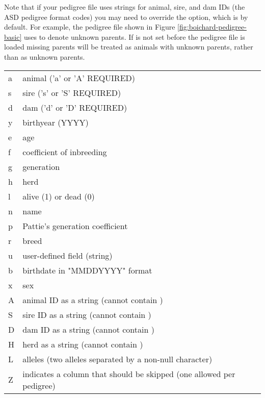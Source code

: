 Note that if your pedigree file uses strings for animal, sire, and dam IDs (the ASD pedigree format codes) you may need to override the  option, which is  by default.  For example, the pedigree file shown in Figure \ref{fig:boichard-pedigree-basic} uses  to denote unknown parents.  If  is not set before the pedigree file is loaded missing parents will be treated as animals with unknown parents, rather than as unknown parents.
\begin{center}
    \tablelasttail{\hline}
    \label{tbl:pedigree-format-codes}
    \begin{xtabular}{l|p{4in}}
	a & animal ('a' or 'A' REQUIRED)\\
	s & sire ('s' or 'S' REQUIRED)\\
	d & dam ('d' or 'D' REQUIRED)\\
	y & birthyear (YYYY)\\
	e & age\\
	f & coefficient of inbreeding\\
	g & generation\\
	h & herd\\
	l & alive (1) or dead (0)\\
	n & name\\
	p & Pattie's \citeyear{Pattie1965} generation coefficient\\
	r & breed\\
	u & user-defined field (string)\\
	b & birthdate in "MMDDYYYY" format\\
	x & sex\\
	A & animal ID as a string (cannot contain )\\
	S & sire ID as a string (cannot contain )\\
	D & dam ID as a string (cannot contain )\\
	H & herd as a string (cannot contain )\\
	L & alleles (two alleles separated by a non-null character)\\
	Z & indicates a column that should be skipped (one allowed per pedigree)\\
    \end{xtabular}
\end{center}
